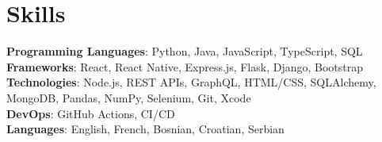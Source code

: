 \section{Skills}
    \begin{itemize}[leftmargin=0.15in, label={}]
	\small{\item{
		\textbf{Programming Languages}{: Python, Java, JavaScript, TypeScript, SQL} \\
		\textbf{Frameworks}{: React, React Native, Express.js, Flask, Django, Bootstrap} \\
		\textbf{Technologies}{: Node.js, REST APIs, GraphQL,  HTML/CSS, SQLAlchemy, MongoDB, Pandas, NumPy, Selenium, Git, Xcode} \\
		\textbf{DevOps}{: GitHub Actions, CI/CD} \\
		\textbf{Languages}{: English, French, Bosnian, Croatian, Serbian} \\
	}}
    \end{itemize}
